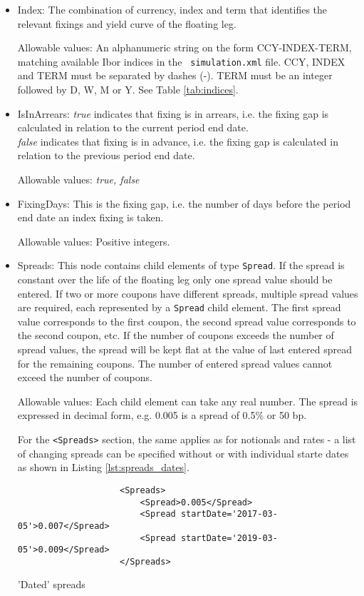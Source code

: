\begin{itemize}
\item Index:  The combination of currency, index and term that
  identifies the relevant fixings and yield curve of the floating leg.  

  Allowable values: An alphanumeric string on the form CCY-INDEX-TERM, matching available Ibor indices in the {\tt
    simulation.xml} file. CCY, INDEX and TERM must be separated by dashes (-). TERM must be an integer followed by D, W,
  M or Y. See Table \ref{tab:indices}.

\item IsInArrears:  \emph{true} indicates that  fixing is in arrears,
  i.e. the fixing gap is calculated in relation to the current period
  end date.\\ \emph{false} indicates that  fixing is in advance,
  i.e. the fixing gap is calculated in relation to the previous period
  end date.  

Allowable values:  \emph{true, false}

\item FixingDays: This is the fixing gap, i.e. the number of days
  before the period end date an index fixing is taken.   

Allowable values:  Positive integers.  

\item Spreads: This node contains child elements of type
  \lstinline!Spread!. If the spread is constant over the life of the
  floating leg only one spread value should be entered. If two or more
  coupons have different spreads, multiple spread values are required,
  each represented by a \lstinline!Spread! child element. The first
  spread value corresponds to the first coupon, the second spread
  value corresponds to the second coupon, etc. If the number of
  coupons exceeds the number of spread values, the spread will be kept
  flat at the value of last entered spread for the remaining coupons.
  The number of entered spread values cannot exceed the number of
  coupons. 

  Allowable values: Each child element can take any real number. The spread is expressed in decimal form, e.g. 0.005 is
  a spread of 0.5\% or 50 bp.

For the {\tt <Spreads>} section, the same applies as for notionals and
rates - a list of changing spreads can be specified without or with individual starte dates as shown
in Listing \ref{lst:spreads_dates}.
\begin{listing}[H]
\begin{verbatim}
                    <Spreads>
                        <Spread>0.005</Spread>
                        <Spread startDate='2017-03-05'>0.007</Spread>
                        <Spread startDate='2019-03-05'>0.009</Spread>
                    </Spreads>
\end{verbatim}
\caption{'Dated' spreads}
\label{lst:spreads_dates}
\end{listing}


\end{itemize}
